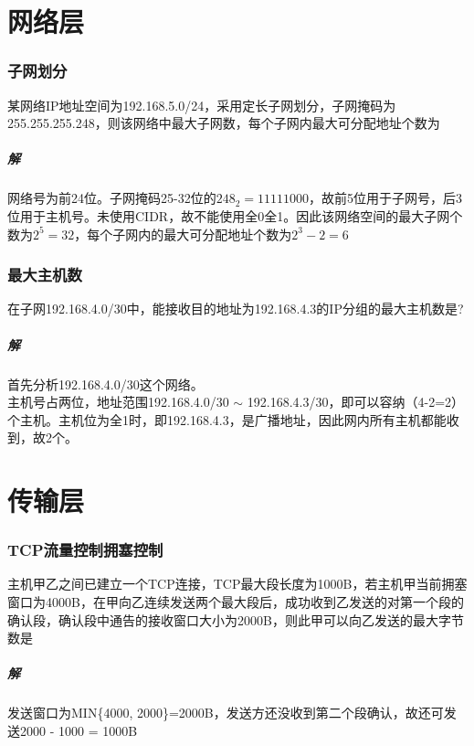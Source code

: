 \section{网络层}

\subsubsection{子网划分}
某网络IP地址空间为192.168.5.0/24，采用定长子网划分，子网掩码为255.255.255.248，则该网络中最大子网数，每个子网内最大可分配地址个数为

\subparagraph{解}
网络号为前24位。子网掩码25-32位的\(248_2 = 11111000\)，故前5位用于子网号，后3位用于主机号。未使用CIDR，故不能使用全0全1。因此该网络空间的最大子网个数为\(2^5 = 32\)，每个子网内的最大可分配地址个数为\(2^3 - 2 = 6\)


\subsubsection{最大主机数}
在子网192.168.4.0/30中，能接收目的地址为192.168.4.3的IP分组的最大主机数是?

\subparagraph{解}
首先分析192.168.4.0/30这个网络。 \\
主机号占两位，地址范围192.168.4.0/30 \(\sim\) 192.168.4.3/30，即可以容纳（4-2=2）个主机。主机位为全1时，即192.168.4.3，是广播地址，因此网内所有主机都能收到，故2个。


\section{传输层}

\subsubsection{TCP流量控制拥塞控制}
主机甲乙之间已建立一个TCP连接，TCP最大段长度为1000B，若主机甲当前拥塞窗口为4000B，在甲向乙连续发送两个最大段后，成功收到乙发送的对第一个段的确认段，确认段中通告的接收窗口大小为2000B，则此甲可以向乙发送的最大字节数是

\subparagraph{解}
发送窗口为MIN\{4000, 2000\}=2000B，发送方还没收到第二个段确认，故还可发送2000 - 1000 = 1000B


